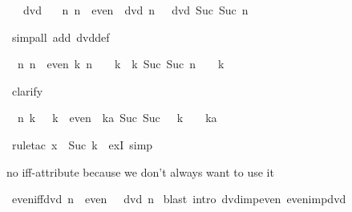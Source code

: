 \begin{isabellebody}
\begin{isamarkuptxt}
\begin{isabelle}
\ {}{\isachardot}\ {}\ dvd\ {}\isanewline
\ {}{\isachardot}\ {\isasymAnd}n{\isachardot}\ {\isasymlbrakk}n\ {\isasymin}\ even{\isacharsemicolon}\ {}\ dvd\ n{\isasymrbrakk}\ {\isasymLongrightarrow}\ {}\ dvd\ Suc\ {\isacharparenleft}Suc\ n{\isacharparenright}%
\end{isabelle}%
\end{isamarkuptxt}%
\ {\isacharparenleft}simp{\isacharunderscore}all\ add{\isacharcolon}\ dvd{\isacharunderscore}def{\isacharparenright}%
\begin{isamarkuptxt}%
\begin{isabelle}%
\ {}{\isachardot}\ {\isasymAnd}n{\isachardot}\ {\isasymlbrakk}n\ {\isasymin}\ even{\isacharsemicolon}\ {\isasymexists}k{\isachardot}\ n\ {\isacharequal}\ {}\ {\isacharasterisk}\ k{\isasymrbrakk}\ {\isasymLongrightarrow}\ {\isasymexists}k{\isachardot}\ Suc\ {\isacharparenleft}Suc\ n{\isacharparenright}\ {\isacharequal}\ {}\ {\isacharasterisk}\ k%
\end{isabelle}%
\end{isamarkuptxt}%
\ clarify%
\begin{isamarkuptxt}%
\begin{isabelle}%
\ {}{\isachardot}\ {\isasymAnd}n\ k{\isachardot}\ {}\ {\isacharasterisk}\ k\ {\isasymin}\ even\ {\isasymLongrightarrow}\ {\isasymexists}ka{\isachardot}\ Suc\ {\isacharparenleft}Suc\ {\isacharparenleft}{}\ {\isacharasterisk}\ k{\isacharparenright}{\isacharparenright}\ {\isacharequal}\ {}\ {\isacharasterisk}\ ka%
\end{isabelle}%
\end{isamarkuptxt}%
\ {\isacharparenleft}rule{\isacharunderscore}tac\ x\ {\isacharequal}\ {\isachardoublequote}Suc\ k{\isachardoublequote}\ \ exI{\isacharcomma}\ simp{\isacharparenright}\isanewline
{}%
\begin{isamarkuptext}%
no iff-attribute because we don't always want to use it%
\end{isamarkuptext}%
\ even{\isacharunderscore}iff{\isacharunderscore}dvd{\isacharcolon}\ {\isachardoublequote}{\isacharparenleft}n\ {\isasymin}\ even{\isacharparenright}\ {\isacharequal}\ {\isacharparenleft}{}\ dvd\ n{\isacharparenright}{\isachardoublequote}\isanewline
{}\ {\isacharparenleft}blast\ intro{\isacharcolon}\ dvd{\isacharunderscore}imp{\isacharunderscore}even\ even{\isacharunderscore}imp{\isacharunderscore}dvd{\isacharparenright}%

\end{isabellebody}
